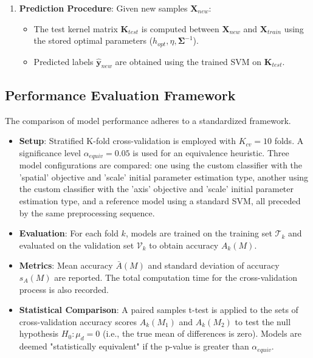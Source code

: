 \documentclass[conference]{IEEEtran}
\newcommand{\mat}[1]{\mathbf{#1}} %
\newcommand{\vecbf}[1]{\bm{#1}} %
\newcommand{\set}[1]{\mathcal{#1}} %
\begin{document}
\begin{enumerate}
\begin{itemize}
            \item A standard SVM (e.g., `sklearn.svm.SVC`) with `kernel='precomputed'` is trained using \(\mat{K}_{train\_opt}\) and \(\vecbf{y}\).
        \end{itemize}
    \item \textbf{Prediction Procedure}: Given new samples \(\mat{X}_{new}\):
        \begin{itemize}
            \item The test kernel matrix \(\mat{K}_{test}\) is computed between \(\mat{X}_{new}\) and \(\mat{X}_{train}\) using the stored optimal parameters (\(h_{opt}, \eta, \mat{\Sigma}^{-1}\)).
            \item Predicted labels \(\hat{\vecbf{y}}_{new}\) are obtained using the trained SVM on \(\mat{K}_{test}\).
        \end{itemize}
\end{enumerate}

\subsection{Performance Evaluation Framework}
The comparison of model performance adheres to a standardized framework.
\begin{itemize}
    \item \textbf{Setup}: Stratified K-fold cross-validation is employed with \(K_{cv}=10\) folds. A significance level \(\alpha_{equiv}=0.05\) is used for an equivalence heuristic. Three model configurations are compared: one using the custom classifier with the 'spatial' objective and 'scale' initial parameter estimation type, another using the custom classifier with the 'axis' objective and 'scale' initial parameter estimation type, and a reference model using a standard SVM, all preceded by the same preprocessing sequence.
    \item \textbf{Evaluation}: For each fold \(k\), models are trained on the training set \(\set{T}_k\) and evaluated on the validation set \(\set{V}_k\) to obtain accuracy \(A_k(M)\).
    \item \textbf{Metrics}: Mean accuracy \(\bar{A}(M)\) and standard deviation of accuracy \(s_A(M)\) are reported. The total computation time for the cross-validation process is also recorded.
    \item \textbf{Statistical Comparison}: A paired samples t-test is applied to the sets of cross-validation accuracy scores \(A_k(M_1)\) and \(A_k(M_2)\) to test the null hypothesis \(H_0: \mu_d = 0\) (i.e., the true mean of differences is zero). Models are deemed "statistically equivalent" if the p-value is greater than \(\alpha_{equiv}\).
\end{itemize}
\end{document}
